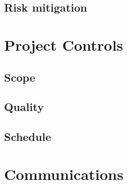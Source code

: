 \documentclass[a4paper, 12pt]{article}
\begin{document}
		\subsection{Risk mitigation}

	\newpage
	\section{Project Controls}
		\subsection{Scope}

		\subsection{Quality}

		\subsection{Schedule}

	\newpage
	\section{Communications}
\end{document}
